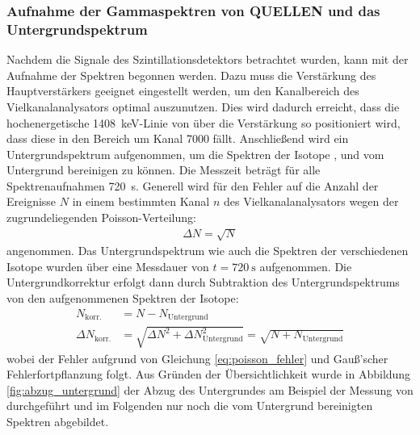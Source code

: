 \documentclass[11pt, a4paper]{article}
\numberwithin{equation}{section}
\begin{document}
\subsubsection{Aufnahme der Gammaspektren von QUELLEN und das Untergrundspektrum}
Nachdem die Signale des Szintillationsdetektors betrachtet wurden, kann mit der Aufnahme der Spektren begonnen werden.
Dazu muss die Verstärkung des Hauptverstärkers geeignet eingestellt werden, um den Kanalbereich des Vielkanalanalysators optimal auszunutzen.
Dies wird dadurch erreicht, dass die hochenergetische \SI{1408}{keV}-Linie von  über die Verstärkung so positioniert wird, dass diese in den Bereich um Kanal 7000 fällt.
Anschließend wird ein Untergrundspektrum aufgenommen, um die Spektren der Isotope ,  und  vom Untergrund bereinigen zu können.
Die Messzeit beträgt für alle Spektrenaufnahmen \SI{720}{\second}.
Generell wird für den Fehler auf die Anzahl der Ereignisse $N$ in einem bestimmten Kanal $n$ des Vielkanalanalysators wegen der zugrundeliegenden Poisson-Verteilung:
\begin{align}
\label{eq:poisson_fehler}
\Delta N = \sqrt{N}
\end{align}
angenommen.
Das Untergrundspektrum wie auch die Spektren der verschiedenen Isotope wurden über eine Messdauer von $t = \SI{720}{\second}$ aufgenommen.
Die Untergrundkorrektur erfolgt dann durch Subtraktion des Untergrundspektrums von den aufgenommenen Spektren der Isotope:
\begin{align}
	\label{eq:untergrundkorr_fehler}
	N_\mathrm{korr.} &= N - N_\mathrm{Untergrund}  \nonumber\\
	\Delta N_\mathrm{korr.} &= \sqrt{\Delta N^2 + \Delta N_\mathrm{Untergrund}^2} = \sqrt{N + N_\mathrm{Untergrund}}
\end{align}
wobei der Fehler aufgrund von Gleichung \ref{eq:poisson_fehler} und Gauß'scher Fehlerfortpflanzung folgt.
Aus Gründen der Übersichtlichkeit wurde in Abbildung \ref{fig:abzug_untergrund} der Abzug des Untergrundes am Beispiel der Messung von  durchgeführt und im Folgenden nur noch die vom Untergrund bereinigten Spektren abgebildet.
\end{document}
